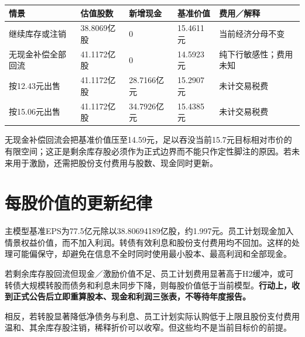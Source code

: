 \begin{exhibitbox}[剩余库存股回流的量化边界]
\small
\noindent\begin{tabularx}{\textwidth}{L{3.2cm}R{2.0cm}R{2.0cm}R{2.0cm}X}
\toprule
\textbf{情景} & \textbf{估值股数} & \textbf{新增现金} & \textbf{基准价值} & \textbf{费用／解释} \\
\midrule
继续库存或注销 & 38.8069亿股 & 0 & 15.4611元 & 当前经济分母不变 \\
无现金补偿全部回流 & 41.1172亿股 & 0 & 14.5923元 & 纯下行敏感性；费用未知 \\
按12.43元出售 & 41.1172亿股 & 28.7166亿元 & 15.2907元 & 未计交易税费 \\
按15.06元出售 & 41.1172亿股 & 34.7926亿元 & 15.4385元 & 未计交易税费 \\
\bottomrule
\end{tabularx}
\end{exhibitbox}

无现金补偿回流会把基准价值压至14.59元，足以吞没当前15.7元目标相对市价的有限空间；这正是剩余库存股必须作为正式边界而不能只作定性脚注的原因。若未来用于激励，还需把股份支付费用与股数、现金同时更新。

\section{每股价值的更新纪律}

主模型基准EPS为77.5亿元除以38.80694189亿股，约1.997元。员工计划现金加入情景权益价值，而不加入利润。转债有效利息和股份支付费用均不回加。这样的处理可能偏保守，却避免在信息不全时同时使用最小股本、最高利润和全部现金。

\begin{riskbox}[资本结构失效条件]
若剩余库存股回流但现金／激励价值不足、员工计划费用显著高于H2缓冲，或可转债大规模转股而债务和利息未同步下降，则每股价值低于当前模型。\textbf{行动上，收到正式公告后立即重算股本、现金和利润三张表，不等待年度报告。}
\end{riskbox}

相反，若转股显著降低净债务与利息、员工计划实际认购低于上限且股份支付费用温和、其余库存股注销，稀释折价可以收窄。但这些均不是当前目标价的前提。
